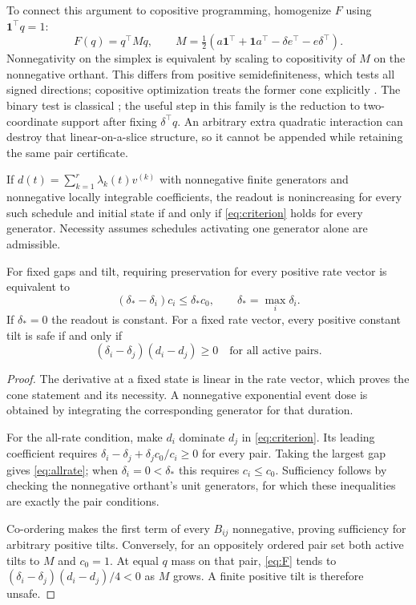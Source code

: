 To connect this argument to copositive programming, homogenize $F$ using $\mathbf1^\top q=1$:
\begin{equation}\label{eq:copositive-matrix}
F(q)=q^\top Mq,\qquad
M=\tfrac12(a\mathbf1^\top+\mathbf1a^\top
-\delta e^\top-e\delta^\top).
\end{equation}
Nonnegativity on the simplex is equivalent by scaling to copositivity of $M$ on the nonnegative orthant. This differs from positive semidefiniteness, which tests all signed directions; copositive optimization treats the former cone explicitly \cite{dur}. The binary test is classical \cite{copositive}; the useful step in this family is the reduction to two-coordinate support after fixing $\delta^\top q$. An arbitrary extra quadratic interaction can destroy that linear-on-a-slice structure, so it cannot be appended while retaining the same pair certificate.

\begin{corollary}\label{cor:cone}
If $d(t)=\sum_{k=1}^r\lambda_k(t)v^{(k)}$ with nonnegative finite generators and nonnegative locally integrable coefficients, the readout is nonincreasing for every such schedule and initial state if and only if \eqref{eq:criterion} holds for every generator. Necessity assumes schedules activating one generator alone are admissible.

For fixed gaps and tilt, requiring preservation for every positive rate vector is equivalent to
\begin{equation}\label{eq:allrate}
(\delta_*-\delta_i)c_i\le\delta_*c_0,\qquad
\delta_*=\max_i\delta_i.
\end{equation}
If $\delta_*=0$ the readout is constant. For a fixed rate vector, every positive constant tilt is safe if and only if
\begin{equation}\label{eq:coorder}
(\delta_i-\delta_j)(d_i-d_j)\ge0
\quad\text{for all active pairs}.
\end{equation}
\end{corollary}
\begin{proof}
The derivative at a fixed state is linear in the rate vector, which proves the cone statement and its necessity. A nonnegative exponential event dose is obtained by integrating the corresponding generator for that duration.

For the all-rate condition, make $d_i$ dominate $d_j$ in \eqref{eq:criterion}. Its leading coefficient requires
$\delta_i-\delta_j+\delta_jc_0/c_i\ge0$ for every pair. Taking the largest gap gives \eqref{eq:allrate}; when $\delta_i=0<\delta_*$ this requires $c_i\le c_0$. Sufficiency follows by checking the nonnegative orthant's unit generators, for which these inequalities are exactly the pair conditions.

Co-ordering makes the first term of every $B_{ij}$ nonnegative, proving sufficiency for arbitrary positive tilts. Conversely, for an oppositely ordered pair set both active tilts to $M$ and $c_0=1$. At equal $q$ mass on that pair, \eqref{eq:F} tends to $(\delta_i-\delta_j)(d_i-d_j)/4<0$ as $M$ grows. A finite positive tilt is therefore unsafe.
\end{proof}

